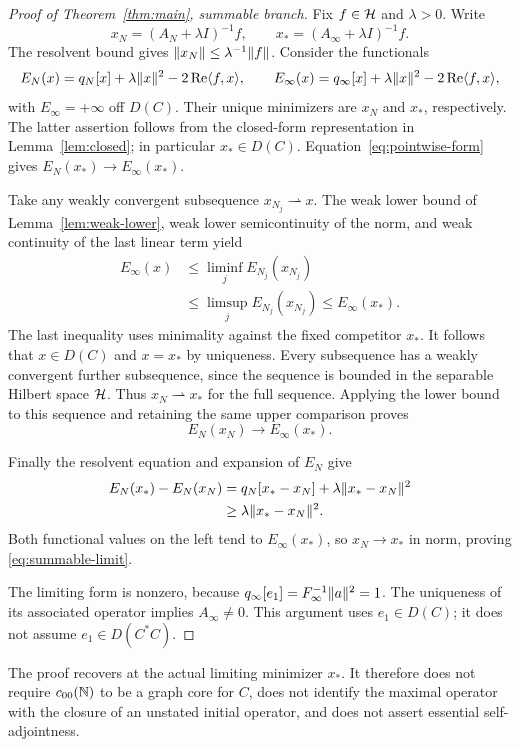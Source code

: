 \begin{proof}[Proof of Theorem~\ref{thm:main}, summable branch]
Fix $f\in\mathcal{H}$ and $\lambda>0$. Write
\[
 x_N=(A_N+\lambda I)^{-1}f,\qquad
 x_*=(A_\infty+\lambda I)^{-1}f.
\]
The resolvent bound gives $\lVert x_N\rVert\le\lambda^{-1}\lVert f\rVert$.
Consider the functionals
\[
 E_N(x)=q_N[x]+\lambda\lVert x\rVert^2-2\operatorname{Re}\langle f,x\rangle,
 \qquad
 E_\infty(x)=q_\infty[x]+\lambda\lVert x\rVert^2-2\operatorname{Re}\langle f,x\rangle,
\]
with $E_\infty=+\infty$ off $D(C)$.
Their unique minimizers are $x_N$ and $x_*$, respectively.
The latter assertion follows from the closed-form representation in
Lemma~\ref{lem:closed}; in particular $x_*\in D(C)$.
Equation~\eqref{eq:pointwise-form} gives
$E_N(x_*)\to E_\infty(x_*)$.

Take any weakly convergent subsequence $x_{N_j}\rightharpoonup x$.
The weak lower bound of Lemma~\ref{lem:weak-lower}, weak lower
semicontinuity of the norm, and weak continuity of the last linear
term yield
\begin{equation}
 \begin{split}
 E_\infty(x)
 &\le\liminf_j E_{N_j}(x_{N_j})\\
 &\le\limsup_j E_{N_j}(x_{N_j})
 \le E_\infty(x_*).
 \end{split}
 \label{eq:minimizer-chain}
\end{equation}
The last inequality uses minimality against the fixed competitor $x_*$.
It follows that $x\in D(C)$ and $x=x_*$ by uniqueness.
Every subsequence has a weakly convergent further subsequence, since
the sequence is bounded in the separable Hilbert space $\mathcal{H}$.
Thus $x_N\rightharpoonup x_*$ for the full sequence.
Applying the lower bound to this sequence and retaining the same
upper comparison proves
\[
 E_N(x_N)\longrightarrow E_\infty(x_*).
\]

Finally the resolvent equation and expansion of $E_N$ give
\begin{equation}
 \begin{split}
 E_N(x_*)-E_N(x_N)
 &=q_N[x_*-x_N]+\lambda\lVert x_*-x_N\rVert^2\\
 &\ge\lambda\lVert x_*-x_N\rVert^2.
 \end{split}
 \label{eq:strong-convexity}
\end{equation}
Both functional values on the left tend to $E_\infty(x_*)$, so
$x_N\to x_*$ in norm, proving \eqref{eq:summable-limit}.

The limiting form is nonzero, because
$q_\infty[e_1]=F_\infty^{-1}\lVert a\rVert^2=1$.
The uniqueness of its associated operator implies $A_\infty\ne0$.
This argument uses $e_1\in D(C)$; it does not assume
$e_1\in D(C^*C)$.
\end{proof}

The proof recovers at the actual limiting minimizer $x_*$.
It therefore does not require $c_{00}(\mathbb{N})$ to be a graph core for $C$,
does not identify the maximal operator with the closure of an
unstated initial operator, and does not assert essential self-adjointness.

